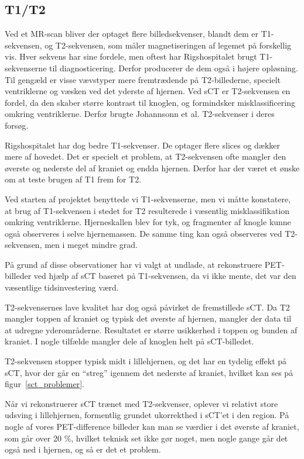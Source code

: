 \subsection{T1/T2}

Ved et MR-scan bliver der optaget flere billedsekvenser, blandt dem er T1-sekvensen, og T2-sekvensen, som måler magnetiseringen af legemet på forskellig vis. Hver sekvens har sine fordele, men oftest har Rigshospitalet brugt T1-sekvenserne til diagnosticering. Derfor producerer de dem også i højere opløsning. Til gengæld er visse vævstyper mere fremtrædende på T2-billederne, specielt ventriklerne og væsken ved det yderste af hjernen. Ved sCT er T2-sekvensen en fordel, da den skaber større kontrast til knoglen, og formindsker misklassificering omkring ventriklerne. Derfor brugte Johannsonn et al. T2-sekvenser i deres forsøg.

Rigshospitalet har dog bedre T1-sekvenser. De optager flere slices og dækker mere af hovedet. Det er specielt et problem, at T2-sekvensen ofte mangler den øverste og nederste del af kraniet og endda hjernen. Derfor har der været et ønske om at teste brugen af T1 frem for T2.

Ved starten af projektet benyttede vi T1-sekvenserne, men vi måtte konstatere, at brug af T1-sekvensen i stedet for T2 resulterede i væsentlig misklassifikation omkring ventriklerne. Hjerneskallen blev for tyk, og fragmenter af knogle kunne også observeres i selve hjernemassen. De samme ting kan også observeres ved T2-sekvensen, men i meget mindre grad.

På grund af disse observationer har vi valgt at undlade, at rekonstruere PET-billeder ved hjælp af sCT baseret på T1-sekvensen, da vi ikke mente, det var den væsentlige tidsinvestering værd.

T2-sekvensernes lave kvalitet har dog også påvirket de fremstillede sCT. Da T2 mangler toppen af kraniet og typisk det øverste af hjernen, mangler der data til at udregne yderområderne. Resultatet er større usikkerhed i toppen og bunden af kraniet. I nogle tilfælde mangler dele af knoglen helt på sCT-billedet. 

T2-sekvensen stopper typisk midt i lillehjernen, og det har en tydelig effekt på sCT, hvor der går en “streg” igennem det nederste af kraniet, hvilket kan ses på figur~\ref{sct_problemer}. 

Når vi rekonstruerer sCT trænet med T2-sekvenser, oplever vi relativt store udsving i lillehjernen, formentlig grundet ukorrekthed i sCT’et i den region. På nogle af vores PET-difference billeder kan man se værdier i det øverste af kraniet, som går over 20 \%, hvilket teknisk set ikke gør noget, men nogle gange går det også ned i hjernen, og så er det et problem.

